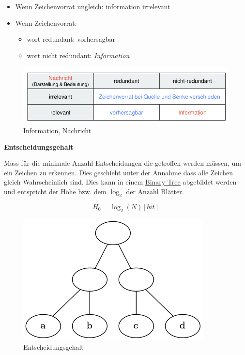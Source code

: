 \documentclass[11pt,twoside,twocolumn,landscape]{article}
\begin{document}
\begin{itemize}
\item Wenn Zeichenvorrat ungleich: information irrelevant
\item Wenn Zeichenvorrat:
\begin{itemize}
\item wort redundant: vorhersagbar
\item wort nicht redundant: \emph{Information}
\end{itemize}
\end{itemize}


\begin{figure}[htbp]
\centering
\includegraphics[width=.9\linewidth]{img/informations_uebertragung_information.png}
\caption{\label{fig:org3e104ad}Information, Nachricht}
\end{figure}

\textbf{Entscheidungsgehalt}

Mass für die minimale Anzahl Entscheidungen die getroffen werden müssen, um ein Zeichen zu erkennen.
Dies geschieht unter der Annahme dass alle Zeichen gleich Wahrscheinlich sind.
Dies kann in einem \href{../../../roam/20210806225200-binary_tree.org}{Binary Tree} abgebildet werden und entspricht der Höhe bzw. dem \(\log_2\) der Anzahl Blätter.

\begin{equation}
H_0 = \log_2(N)[bit]
\end{equation}

\begin{figure}[htbp]
\centering
\includegraphics[width=.9\linewidth]{img/entscheidungsgehalt_tree.png}
\caption{\label{fig:org285df54}Entscheidungsgehalt}
\end{figure}
\end{document}
